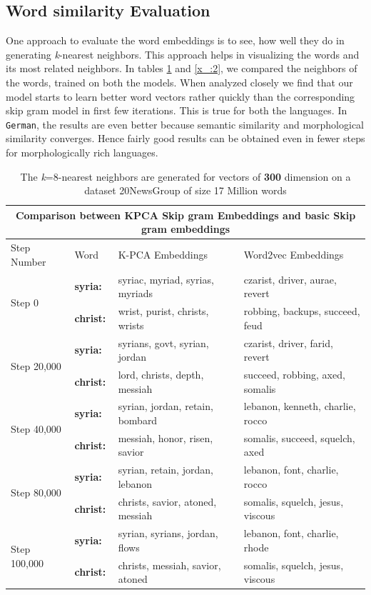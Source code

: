 \subsection{Word similarity Evaluation} 
One approach to evaluate the word embeddings is to see, how well they do in generating \textit{k}-nearest neighbors. This approach helps in visualizing the words and its most related neighbors. In tables \ref{x:1} and \ref{x_:2}, we compared the neighbors of the words, trained on both the models. When analyzed closely we find that our model starts to learn better word vectors rather quickly than the corresponding skip gram model in first few iterations. This is true for both the languages. In \texttt{German}, the results are even better because semantic similarity and morphological similarity converges. Hence fairly good results can be obtained even in fewer steps for morphologically rich languages. 
\begin{table}[H]
	\hskip-0.5cm
	\begin{tabular}[htbp]{|l|l|l|l|}	
		\hline
		\multicolumn{4}{|c|}{\textbf{Comparison between KPCA Skip gram Embeddings and basic Skip gram embeddings}} \\
		\hline
		Step Number&Word &K-PCA Embeddings & Word2vec Embeddings\\ \hline
		\multirow{2}{*}{Step 0} &\textbf{syria:}&syriac, myriad, syrias, myriads & czarist, driver, aurae, revert\\
		&\textbf{christ:}& wrist, purist, christs, wrists &robbing, backups, succeed, feud \\ 
		\hline
		\multirow{2}{*}{Step 20,000} & \textbf{syria:}&syrians, govt, syrian, jordan& czarist, driver, farid, revert \\
		& \textbf{christ:}&lord, christs, depth, messiah & succeed, robbing, axed, somalis \\
		\hline
		\multirow{2}{*}{Step 40,000} &\textbf{syria:}&syrian, jordan, retain, bombard& lebanon, kenneth, charlie, rocco\\
		& \textbf{christ:}&messiah, honor, risen, savior & somalis, succeed, squelch, axed\\
		\hline
		\multirow{2}{*}{Step 80,000} &\textbf{syria:}&syrian, retain, jordan, lebanon& lebanon, font, charlie, rocco\\
		& \textbf{christ:}&christs, savior, atoned, messiah & somalis, squelch, jesus, viscous\\
		\hline
		\multirow{2}{*}{Step 100,000} & \textbf{syria:}&syrian, syrians, jordan, flows& lebanon, font, charlie, rhode\\
		& \textbf{christ:}&christs, messiah, savior, atoned& somalis, squelch, jesus, viscous\\
		\hline
	\end{tabular}
	\caption{The \textit{k}=8-nearest neighbors are generated for vectors of \textbf{300} dimension on a dataset 20NewsGroup of size 17 Million words}\label{x:1}
\end{table}
